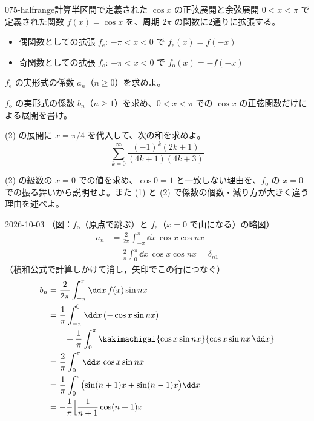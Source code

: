 \documentclass[uplatex,dvipdfmx,a4paper,11pt]{jsarticle}
\begin{document}
\begin{mondai}{075-halfrange}{計算}{半区間で定義された $\cos x$ の正弦展開と余弦展開}
$0<x<\pi$ で定義された関数 $f(x)=\cos x$ を、周期 $2\pi$ の関数に2通りに拡張する。
\begin{itemize}
  \item 偶関数としての拡張 $f_{\mathrm{e}}$: $-\pi<x<0$ で $f_{\mathrm{e}}(x)=f(-x)$
  \item 奇関数としての拡張 $f_{\mathrm{o}}$: $-\pi<x<0$ で $f_{\mathrm{o}}(x)=-f(-x)$
\end{itemize}
\begin{shoumon}
  \item $f_{\mathrm{e}}$ の実形式の係数 $a_n$（$n\ge0$）を求めよ。
  \item $f_{\mathrm{o}}$ の実形式の係数 $b_n$（$n\ge1$）を求め、$0<x<\pi$ での $\cos x$ の正弦関数だけによる展開を書け。
  \item (2) の展開に $x=\pi/4$ を代入して、次の和を求めよ。
\[
\sum_{k=0}^{\infty}\frac{(-1)^{k}(2k+1)}{(4k+1)(4k+3)}
\]
  \item (2) の級数の $x=0$ での値を求め、$\cos0=1$ と一致しない理由を、$f_{\mathrm{o}}$ の $x=0$ での振る舞いから説明せよ。また (1) と (2) で係数の個数・減り方が大きく違う理由を述べよ。
\end{shoumon}
\begin{kotaeutsushi}{2026-10-03}
（図：$f_{\mathrm{o}}$（原点で跳ぶ）と $f_{\mathrm{e}}$（$x=0$ で山になる）の略図）
\begin{align*}
  a_n&=\frac{2}{2\pi}\int_{-\pi}^{\pi}\dd x\,\cos x\cos nx\\
  &=\frac{2}{\pi}\int_{0}^{\pi}\dd x\,\cos x\cos nx=\delta_{n1}
\end{align*}
（積和公式で計算しかけて消し，矢印でこの行につなぐ）
\begin{align*}
  b_n&=\frac{2}{2\pi}\int_{-\pi}^{\pi}\dd x\,f(x)\sin nx\\
  &=\frac{1}{\pi}\int_{-\pi}^{0}\dd x\,(-\cos x\sin nx)\\
  &\qquad+\frac{1}{\pi}\int_{0}^{\pi}\kakimachigai{\cos x\sin nx}{\cos x\sin nx\,\dd x}\\
  &=\frac{2}{\pi}\int_{0}^{\pi}\dd x\,\cos x\sin nx\\
  &=\frac{1}{\pi}\int_{0}^{\pi}\bigl(\sin(n+1)x+\sin(n-1)x\bigr)\dd x\\
  &=-\frac{1}{\pi}\Bigl[\frac{1}{n+1}\cos(n+1)x\\

\end{align*}
\end{kotaeutsushi}
\end{mondai}
\end{document}
